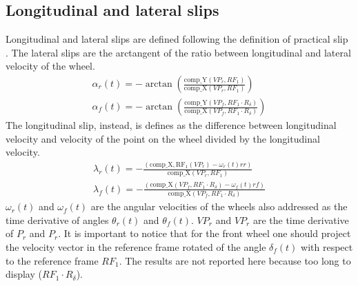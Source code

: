 \subsection{Longitudinal and lateral slips}
%
Longitudinal and lateral slips are defined following the definition of practical slip \cite{lot2004motorcycle,pacejka2006tyre}.
The lateral slips are the arctangent of the ratio between longitudinal and lateral velocity of the wheel. 
%
\begin{equation}
    \begin{array}{l}
        \displaystyle \alpha_r(t) = -\arctan( \frac{ \mathrm{comp\_Y}(VP_r,RF_1) }{\mathrm{comp\_X}(VP_r,RF_1)} )\\
        \displaystyle \alpha_f(t) = -\arctan( \frac{\mathrm{comp\_Y}(VP_f,RF_1\cdot R_\delta)}{\mathrm{comp\_X}(VP_f,RF_1\cdot R_\delta)} )
    \end{array}
\end{equation}
%
The longitudinal slip, instead, is defines as the difference between longitudinal velocity and velocity of the point on the wheel divided by the longitudinal velocity.
%
\begin{equation}
    \begin{array}{l}
        \displaystyle \lambda_r(t) = - \frac{( \mathrm{comp\_X,RF_1}(VP_r)  - \omega_r(t) rr )}{\mathrm{comp\_X}(VP_r,RF_1)}\\  
        \displaystyle \lambda_f(t) = - \frac{( \mathrm{comp\_X}(VP_f,RF_1\cdot R_\delta)  - \omega_f(t) rf )}{\mathrm{comp\_X}(VP_f,RF_1\cdot R_\delta)}
    \end{array}
\end{equation}
%
$\omega_r(t)$ and $\omega_f(t)$ are the angular velocities of the wheels also addressed as the time derivative of angles $\theta_r(t)$ and $\theta_f(t)$. $VP_r$ and $VP_r$ are the time derivative of $P_r$ and $P_r$. 
It is important to notice that for the front wheel one should project the velocity vector in the reference frame rotated of the angle $\delta_f(t)$ with respect to the reference frame $RF_1$. 
The results are not reported here because too long to display ($RF_1\cdot R_\delta$). 
%